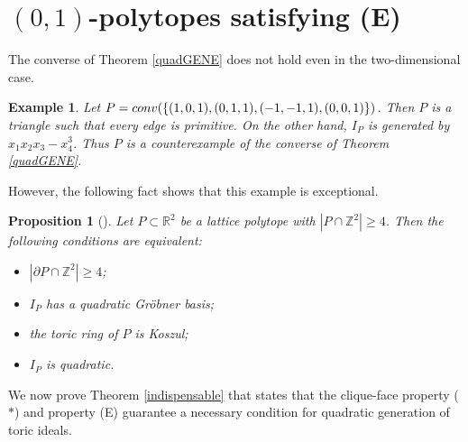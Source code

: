 \documentclass[10pt,a4paper]{amsart}
\newtheorem{prop}[thm]{Proposition}
\newtheorem{example}[thm]{Example}
\numberwithin{thm}{section}
\numberwithin{equation}{section}
\def\NZQ{\mathbb}               %
\def\ZZ{{\NZQ Z}}
\def\RR{{\NZQ R}}
\begin{document}
\section{$(0,1)$-polytopes satisfying (E)}

The converse of Theorem \ref{quadGENE} does not hold even in the two-dimensional case.


\begin{example}\label{counterexam}
Let 
    $P={\rm conv} (\{(1,0,1),(0,1,1),(-1,-1,1), (0,0,1)\})$.
Then $P$ is a triangle such that every edge is primitive.
On the other hand, $I_P$ is generated by $x_1 x_2 x_3 - x_4^3$.
    Thus $P$ is a counterexample of the converse of Theorem \ref{quadGENE}.

\end{example}

However, the following fact shows that this example is exceptional.

\begin{prop}[{\cite[Corollary 3.2.5]{BGT}}]
Let $P \subset \RR^2$ be a lattice polytope with $|P \cap \ZZ^2| \ge 4$.
Then the following conditions are equivalent:
\begin{itemize}
    \item[{\rm (i)}] $|\partial P \cap \ZZ^2| \ge 4${\rm ;}
    \item[{\rm (ii)}] $I_P$ has a quadratic Gr\"{o}bner basis{\rm ;}
    \item[{\rm (iii)}] the toric ring of $P$ is Koszul{\rm ;}
    \item[{\rm (iv)}] $I_P$ is quadratic.
\end{itemize}
    
\end{prop}

We now prove Theorem \ref{indispensable} that states that the clique-face property ($*$) and property (E) guarantee 
a necessary condition for quadratic generation of toric ideals.
    
\end{document}
